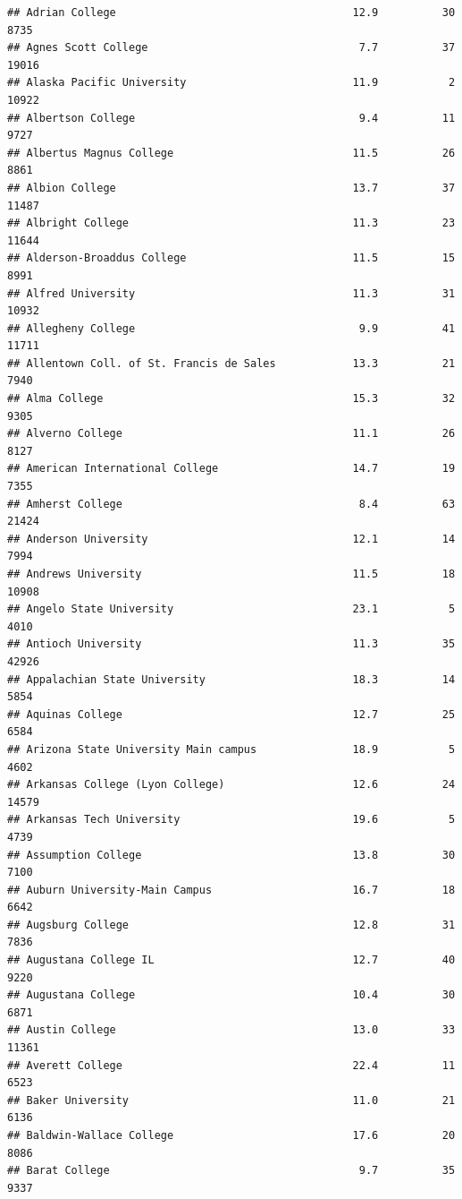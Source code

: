 \documentclass[
]{article}
\begin{document}
\begin{verbatim}
## Adrian College                                     12.9          30   8735
## Agnes Scott College                                 7.7          37  19016
## Alaska Pacific University                          11.9           2  10922
## Albertson College                                   9.4          11   9727
## Albertus Magnus College                            11.5          26   8861
## Albion College                                     13.7          37  11487
## Albright College                                   11.3          23  11644
## Alderson-Broaddus College                          11.5          15   8991
## Alfred University                                  11.3          31  10932
## Allegheny College                                   9.9          41  11711
## Allentown Coll. of St. Francis de Sales            13.3          21   7940
## Alma College                                       15.3          32   9305
## Alverno College                                    11.1          26   8127
## American International College                     14.7          19   7355
## Amherst College                                     8.4          63  21424
## Anderson University                                12.1          14   7994
## Andrews University                                 11.5          18  10908
## Angelo State University                            23.1           5   4010
## Antioch University                                 11.3          35  42926
## Appalachian State University                       18.3          14   5854
## Aquinas College                                    12.7          25   6584
## Arizona State University Main campus               18.9           5   4602
## Arkansas College (Lyon College)                    12.6          24  14579
## Arkansas Tech University                           19.6           5   4739
## Assumption College                                 13.8          30   7100
## Auburn University-Main Campus                      16.7          18   6642
## Augsburg College                                   12.8          31   7836
## Augustana College IL                               12.7          40   9220
## Augustana College                                  10.4          30   6871
## Austin College                                     13.0          33  11361
## Averett College                                    22.4          11   6523
## Baker University                                   11.0          21   6136
## Baldwin-Wallace College                            17.6          20   8086
## Barat College                                       9.7          35   9337

\end{verbatim}
\end{document}
